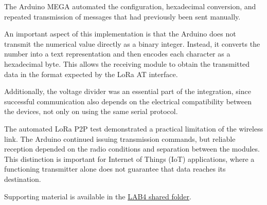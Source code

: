 The Arduino MEGA automated the configuration, hexadecimal conversion, and repeated transmission of messages that had previously been sent manually.

An important aspect of this implementation is that the Arduino does not transmit the numerical value directly as a binary integer.
Instead, it converts the number into a text representation and then encodes each character as a hexadecimal byte.
This allows the receiving module to obtain the transmitted data in the format expected by the LoRa AT interface.

Additionally, the voltage divider was an essential part of the integration, since successful communication also depends on the electrical compatibility between the devices, not only on using the same serial protocol.

The automated LoRa P2P test demonstrated a practical limitation of the wireless link.
The Arduino continued issuing transmission commands, but reliable reception depended on the radio conditions and separation between the modules.
This distinction is important for Internet of Things (IoT) applications, where a functioning transmitter alone does not guarantee that data reaches its destination.

Supporting material is available in the \href{https://drive.google.com/drive/folders/1rxPscm24PQ41dW3EaSxCHFeebt27BfVf}{LAB4 shared folder}.
